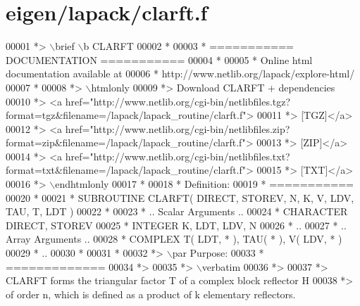 \hypertarget{eigen_2lapack_2clarft_8f_source}{}\section{eigen/lapack/clarft.f}
\label{eigen_2lapack_2clarft_8f_source}

\begin{DoxyCode}
00001 \textcolor{comment}{*> \(\backslash\)brief \(\backslash\)b CLARFT}
00002 \textcolor{comment}{*}
00003 \textcolor{comment}{*  =========== DOCUMENTATION ===========}
00004 \textcolor{comment}{*}
00005 \textcolor{comment}{* Online html documentation available at }
00006 \textcolor{comment}{*            http://www.netlib.org/lapack/explore-html/ }
00007 \textcolor{comment}{*}
00008 \textcolor{comment}{*> \(\backslash\)htmlonly}
00009 \textcolor{comment}{*> Download CLARFT + dependencies }
00010 \textcolor{comment}{*> <a
       href="http://www.netlib.org/cgi-bin/netlibfiles.tgz?format=tgz&filename=/lapack/lapack\_routine/clarft.f"> }
00011 \textcolor{comment}{*> [TGZ]</a> }
00012 \textcolor{comment}{*> <a
       href="http://www.netlib.org/cgi-bin/netlibfiles.zip?format=zip&filename=/lapack/lapack\_routine/clarft.f"> }
00013 \textcolor{comment}{*> [ZIP]</a> }
00014 \textcolor{comment}{*> <a
       href="http://www.netlib.org/cgi-bin/netlibfiles.txt?format=txt&filename=/lapack/lapack\_routine/clarft.f"> }
00015 \textcolor{comment}{*> [TXT]</a>}
00016 \textcolor{comment}{*> \(\backslash\)endhtmlonly }
00017 \textcolor{comment}{*}
00018 \textcolor{comment}{*  Definition:}
00019 \textcolor{comment}{*  ===========}
00020 \textcolor{comment}{*}
00021 \textcolor{comment}{*       SUBROUTINE CLARFT( DIRECT, STOREV, N, K, V, LDV, TAU, T, LDT )}
00022 \textcolor{comment}{* }
00023 \textcolor{comment}{*       .. Scalar Arguments ..}
00024 \textcolor{comment}{*       CHARACTER          DIRECT, STOREV}
00025 \textcolor{comment}{*       INTEGER            K, LDT, LDV, N}
00026 \textcolor{comment}{*       ..}
00027 \textcolor{comment}{*       .. Array Arguments ..}
00028 \textcolor{comment}{*       COMPLEX            T( LDT, * ), TAU( * ), V( LDV, * )}
00029 \textcolor{comment}{*       ..}
00030 \textcolor{comment}{*  }
00031 \textcolor{comment}{*}
00032 \textcolor{comment}{*> \(\backslash\)par Purpose:}
00033 \textcolor{comment}{*  =============}
00034 \textcolor{comment}{*>}
00035 \textcolor{comment}{*> \(\backslash\)verbatim}
00036 \textcolor{comment}{*>}
00037 \textcolor{comment}{*> CLARFT forms the triangular factor T of a complex block reflector H}
00038 \textcolor{comment}{*> of order n, which is defined as a product of k elementary reflectors.}

\end{DoxyCode}
